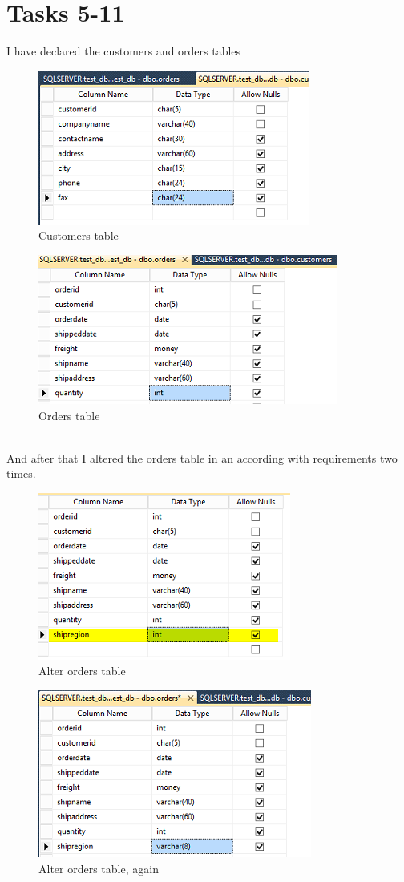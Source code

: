 \documentclass[english]{article}
\begin{document}
\section{Tasks 5-11}
I have declared the customers and orders tables
\begin{figure}[hb]
\centerline{\includegraphics[scale=0.8]{SQLCreateDB/customersTable}}
\caption{Customers table}
\end{figure}
\begin{figure}[hb]
\centerline{\includegraphics[scale=0.8]{SQLCreateDB/ordersTable}}
\caption{Orders table}
\end{figure}
\\And after that I altered the orders table in an according with requirements two times.
\begin{figure}[hb]
 \centerline{\includegraphics[scale=0.8]{SQLCreateDB/alterOrderTable}}
\caption{Alter orders table}
\end{figure}
\newpage
\begin{figure}[hb]
\centerline{\includegraphics[scale=0.8]{SQLCreateDB/alterOrderTable2}}
\caption{Alter orders table, again}
\end{figure}
\end{document}

